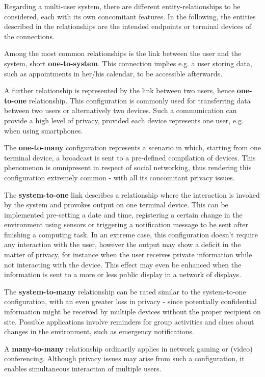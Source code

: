 \documentclass{acm_proc_article-sp}
\begin{document}
Regarding a multi-user system, there are different entity-relationships to be considered, each with its own concomitant features.
In the following, the entities described in the relationships are the intended endpoints or terminal devices of the connections.

Among the most common relationships is the link between the user and the system, short \textbf{one-to-system}.
This connection implies e.g. a user storing data, such as appointments in her/his calendar, to be accessible afterwards.

A further relationship is represented by the link between two users, hence \textbf{one-to-one }relationship.
This configuration is commonly used for transferring data between two users or alternatively two devices.
Such a communication can provide a high level of privacy, provided each device represents one user, e.g. when using smartphones.

The \textbf{one-to-many} configuration represents a scenario in which, starting from one terminal device, a broadcast is sent to a pre-defined compilation of devices.
This phenomenon is omnipresent in respect of social networking, thus rendering this configuration extremely common - with all its concomitant privacy issues.

The \textbf{system-to-one} link describes a relationship where the interaction is invoked by the system and provokes output on one terminal device.
This can be implemented pre-setting a date and time, registering a certain change in the environment using sensors or triggering a notification message to be sent after finishing a computing task.
In an extreme case, this configuration doesn’t require any interaction with the user, however the output may show a deficit in the matter of privacy, for instance when the user receives private information while not interacting with the device.
This effect may even be enhanced when the information is sent to a more or less public display in a network of displays.

The \textbf{system-to-many} relationship can be rated similar to the system-to-one configuration, with an even greater loss in privacy - since potentially confidential information might be received by multiple devices without the proper recipient on site.
Possible applications involve reminders for group activities and clues about changes in the environment, such as emergency notifications.

A \textbf{many-to-many} relationship ordinarily applies in network gaming or (video) conferencing. Although privacy issues may arise from such a configuration, it enables simultaneous interaction of multiple users.
\end{document}
